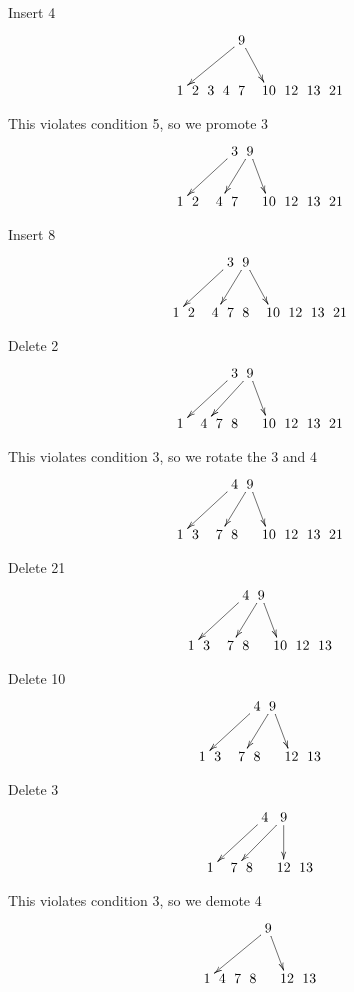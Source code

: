 \documentclass[a4paper]{article}
\begin{document}
Insert 4\\
$$\xymatrix @C=0pt {
& &  &  &    &   & \ar[dllll] 9 \ar[drr] & &   &  &  \\
 &  & 1 & 2 & 3 & 4 & 7 &  & 10 & 12 & 13 & 21 &  &  \\
}$$

This violates condition 5, so we promote 3\\
$$\xymatrix @C=0pt {
& &  &  &    &   & \ar[dllll] 3 & \ar[dll] 9\ar[dr] &   &  &  \\
 &  & 1 & 2 &  & 4 & 7 &  & 10 & 12 & 13 & 21 &  &  \\
}$$

Insert 8\\
$$\xymatrix @C=0pt {
& &  &  &    &   & \ar[dllll] 3 & \ar[dll] 9\ar[drr] &   &  &  \\
 &  & 1 & 2 &  & 4 & 7 & 8 &  & 10 & 12 & 13 & 21 &  &  \\
}$$

Delete 2\\
$$\xymatrix @C=0pt {
& &  &  &    &   & \ar[dllll] 3 & \ar[dlll] 9\ar[dr] &   &  &  \\
 &  & 1 &  & 4 & 7 & 8 &  & 10 & 12 & 13 & 21 &  &  \\
}$$

This violates condition 3, so we rotate the 3 and 4\\
$$\xymatrix @C=0pt {
& &  &  &    &   & \ar[dllll] 4 & \ar[dll] 9\ar[dr] &   &  &  \\
 &  & 1 & 3 &  & 7 & 8 &  & 10 & 12 & 13 & 21 &  &  \\
}$$

Delete 21\\
$$\xymatrix @C=0pt {
& &  &  &    &   & \ar[dllll] 4 & \ar[dll] 9\ar[dr] &   &  &  \\
 &  & 1 & 3 &  & 7 & 8 &  & 10 & 12 & 13 &  &  \\
}$$

Delete 10\\
$$\xymatrix @C=0pt {
& &  &  &    &   & \ar[dllll] 4 & \ar[dll] 9\ar[dr] &   &  &  \\
 &  & 1 & 3 &  & 7 & 8 &  & 12 & 13 &  &  \\
}$$

Delete 3\\
$$\xymatrix @C=0pt {
& &  &  &    &   & \ar[dllll] 4 & \ar[dlll] 9\ar[d] &   &  &  \\
 &  & 1 &  & 7 & 8 &  & 12 & 13 &  &  \\
}$$

This violates condition 3, so we demote 4\\
$$\xymatrix @C=0pt {
& &  &  &    &   & \ar[dllll] 9 \ar[dr] & &   &  &  \\
 &  & 1 & 4 & 7 & 8 &  & 12 & 13 &  &  \\
}$$
\end{document}
